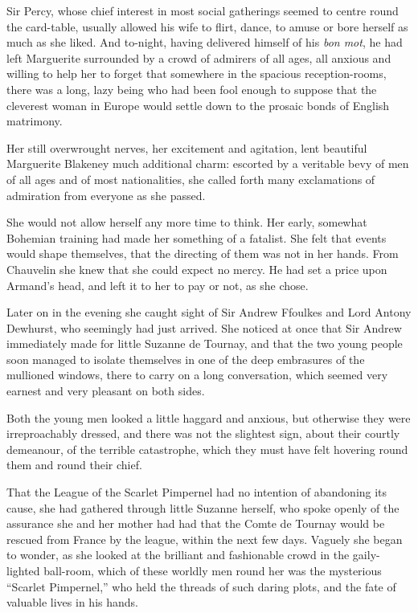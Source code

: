 Sir Percy, whose chief interest in most social gatherings seemed to centre round the card-table, usually allowed his wife to flirt, dance, to amuse or bore herself as much as she liked. And to-night, having delivered himself of his \textit{bon mot}, he had left Marguerite surrounded by a crowd of admirers of all ages, all anxious and willing to help her to forget that somewhere in the spacious reception-rooms, there was a long, lazy being who had been fool enough to suppose that the cleverest woman in Europe would settle down to the prosaic bonds of English matrimony.

Her still overwrought nerves, her excitement and agitation, lent beautiful Marguerite Blakeney much additional charm: escorted by a veritable bevy of men of all ages and of most nationalities, she called forth many exclamations of admiration from everyone as she passed.

She would not allow herself any more time to think. Her early, somewhat Bohemian training had made her something of a fatalist. She felt that events would shape themselves, that the directing of them was not in her hands. From Chauvelin she knew that she could expect no mercy. He had set a price upon Armand's head, and left it to her to pay or not, as she chose.

Later on in the evening she caught sight of Sir Andrew Ffoulkes and Lord Antony Dewhurst, who seemingly had just arrived. She noticed at once that Sir Andrew immediately made for little Suzanne de Tournay, and that the two young people soon managed to isolate themselves in one of the deep embrasures of the mullioned windows, there to carry on a long conversation, which seemed very earnest and very pleasant on both sides.

Both the young men looked a little haggard and anxious, but otherwise they were irreproachably dressed, and there was not the slightest sign, about their courtly demeanour, of the terrible catastrophe, which they must have felt hovering round them and round their chief.

That the League of the Scarlet Pimpernel had no intention of abandoning its cause, she had gathered through little Suzanne herself, who spoke openly of the assurance she and her mother had had that the Comte de Tournay would be rescued from France by the league, within the next few days. Vaguely she began to wonder, as she looked at the brilliant and fashionable crowd in the gaily-lighted ball-room, which of these worldly men round her was the mysterious \enquote{Scarlet Pimpernel,} who held the threads of such daring plots, and the fate of valuable lives in his hands.

